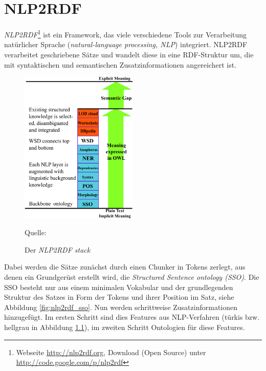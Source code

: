 \chapter{NLP2RDF}

\emph{NLP2RDF}\footnote{Webseite \url{http://nlp2rdf.org}, Download (Open Source) unter \url{http://code.google.com/p/nlp2rdf}}
ist ein Framework, das viele verschiedene Tools zur Verarbeitung natürlicher Sprache (\emph{natural-language processing, NLP}) integriert.
NLP2RDF verarbeitet geschriebene Sätze und wandelt diese in eine RDF-Struktur um, die mit syntaktischen und semantischen Zusatzinformationen angereichert ist.
\begin{figure}[htb]
\begin{center}
\begin{threeparttable}
\includegraphics[width=0.5\textwidth]{img/nlp2rdf_stack.png}
\begin{tablenotes}\footnotesize
 \item [] Quelle: \citet{tiger_corpus_navigator}
\end{tablenotes}
\end{threeparttable}
\caption{Der \emph{NLP2RDF stack}}
\label{fig:nlp2rdf_stack}
\end{center}
\end{figure}
Dabei werden die Sätze zunächst durch einen Chunker in Tokens zerlegt, aus denen ein Grundgerüst erstellt wird, die \emph{Structured Sentence ontology (SSO)}.
Die SSO besteht nur aus einem minimalen Vokabular und der grundlegenden Struktur des Satzes in Form der Tokens und ihrer Position im Satz, siehe Abbildung \ref{fig:nlp2rdf_sso}.
Nun werden schrittweise Zusatzinformationen hinzugefügt.
Im ersten Schritt sind dies Features aus NLP-Verfahren (türkis bzw. hellgrau in Abbildung \ref{fig:nlp2rdf_stack}), im zweiten Schritt Ontologien für diese Features.
